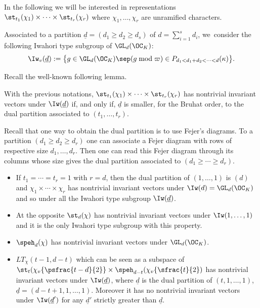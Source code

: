 In the following we will be interested in representations
$\st_{t_1}(\chi_1) \times \cdots \times \st_{t_r}(\chi_r)$ where $\chi_1,\dots,
\chi_r$ are unramified characters.

\begin{nota} \label{nota-iwh0}
Associated to a partition $\underline d=(d_1 \geq d_2 \geq d_s)$ of
$d=\sum_{i=1}^s d_i$, we~consider the following Iwahori type subgroup of
$\GL_d(\OC_K)$:
\[
\Iw_v(\underline d):=
\bigl \{g \in \GL_d(\OC_K) \sep (g \bmod \varpi) \in
P_{d_1 < d_1+d_2 < \cdots < d}(\kappa) \bigr\}.
\]
\end{nota}

Recall the well-known following lemma.

\begin{lemma} \label{lem-iwahori}
With the previous notations,
$\st_{t_1}(\chi_1) \times \cdots \times \st_{t_r}(\chi_r)$ has nontrivial
invariant vectors under $\Iw(\underline d)$ if, and only if, $\underline d$
is smaller, for the Bruhat order, to the dual partition associated to
$(t_1,\dots,t_r)$.
\end{lemma}

\begin{remark}
Recall that one way to obtain the dual partition is to use Fejer's diagrams.
To a partition $(d_1 \geq d_2 \geq d_r)$ one can associate a Fejer diagram
with rows of respective size $d_1,\dots,d_r$. Then one can read this Fejer diagram
through its columns whose size gives the dual partition associated to
$(d_1 \geq \cdots \geq d_r)$.
\end{remark}

\skpt
\begin{examples}
\begin{itemize}
\item If $t_1=\cdots=t_r=1$ with $r=d$, then the dual partition of
$(1,\dots,1)$ is $(d)$ and $\chi_1 \times \cdots \times \chi_r$ has nontrivial
invariant vectors under $\Iw(d)=\GL_d(\OC_K)$ and so under all the
Iwahori type subgroup $\Iw(\underline d)$.

\item At the opposite $\st_d(\chi)$ has nontrivial invariant vectors under
$\Iw(1,\dots,1)$ and it is the only Iwahori type subgroup with this property.

\item $\speh_d(\chi)$ has nontrivial invariant vectors under $\GL_d(\OC_K)$.

\item $LT_{\chi}(t-1,d-t)$ which can be seen as a subspace of
$\st_t(\chi_v \{\psfrac{t-d}{2}\} \times \speh_{d-t}(\chi_v \{\sfrac{t}{2})$
has nontrivial invariant vectors under $\Iw(\underline d)$, where
$\underline d$ is the dual partition of $(t,1,\dots,1)$, \ie $\underline d=(d-t+1,1,\dots,1)$. Moreover it has no nontrivial invariant
vectors under $\Iw(\underline d')$ for any $\underline d'$ strictly greater
than $\underline d$.
\end{itemize}
\end{examples}

